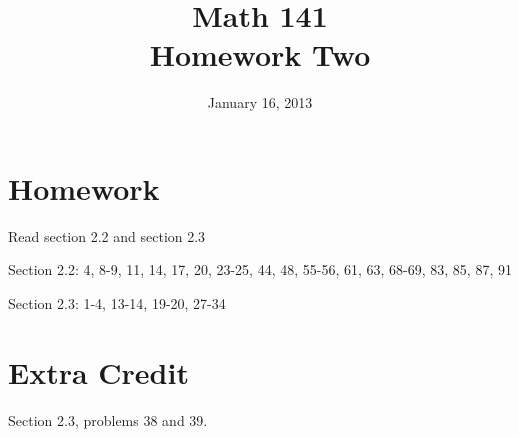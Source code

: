 \documentclass{exam}
\author{}
\date{January 16, 2013}
\title{Math 141 \\ Homework Two}
\begin{document}
\maketitle

\section{Homework}

\begin{itemize*}
  \item Read section 2.2 and section 2.3
  \item Section 2.2: 4, 8-9, 11, 14, 17, 20, 23-25, 44, 48, 55-56, 61, 63, 68-69, 83, 85, 87, 91
  \item Section 2.3: 1-4, 13-14, 19-20, 27-34
\end{itemize*}

\section{Extra Credit}
Section 2.3, problems 38 and 39.
\end{document}
